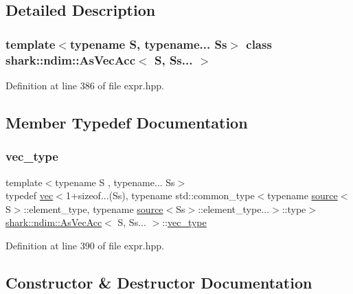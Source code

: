 \subsection{Detailed Description}
\subsubsection*{template$<$typename S, typename... Ss$>$\newline
class shark\+::ndim\+::\+As\+Vec\+Acc$<$ S, Ss... $>$}



Definition at line 386 of file expr.\+hpp.



\subsection{Member Typedef Documentation}
\hypertarget{classshark_1_1ndim_1_1_as_vec_acc_3_01_s_00_01_ss_8_8_8_01_4_acc514ee9d40c54ec227d44759ce80e34}{}\label{classshark_1_1ndim_1_1_as_vec_acc_3_01_s_00_01_ss_8_8_8_01_4_acc514ee9d40c54ec227d44759ce80e34} 
\subsubsection{\texorpdfstring{vec\+\_\+type}{vec\_type}}
{\footnotesize\ttfamily template$<$typename S , typename... Ss$>$ \\
typedef \hyperlink{structshark_1_1ndim_1_1vec}{vec}$<$1+sizeof...(Ss), typename std\+::common\+\_\+type$<$typename \hyperlink{structshark_1_1ndim_1_1source}{source}$<$S$>$\+::element\+\_\+type, typename \hyperlink{structshark_1_1ndim_1_1source}{source}$<$Ss$>$\+::element\+\_\+type...$>$\+::type$>$ \hyperlink{classshark_1_1ndim_1_1_as_vec_acc}{shark\+::ndim\+::\+As\+Vec\+Acc}$<$ S, Ss... $>$\+::\hyperlink{classshark_1_1ndim_1_1_as_vec_acc_3_01_s_00_01_ss_8_8_8_01_4_acc514ee9d40c54ec227d44759ce80e34}{vec\+\_\+type}}



Definition at line 390 of file expr.\+hpp.



\subsection{Constructor \& Destructor Documentation}
\hypertarget{classshark_1_1ndim_1_1_as_vec_acc_3_01_s_00_01_ss_8_8_8_01_4_a15a6a3519508753102c4e96694c9b15c}{}\label{classshark_1_1ndim_1_1_as_vec_acc_3_01_s_00_01_ss_8_8_8_01_4_a15a6a3519508753102c4e96694c9b15c} 

